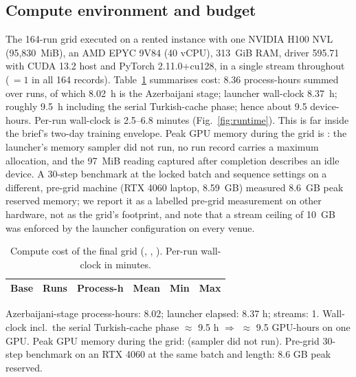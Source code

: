 \subsection{Compute environment and budget}
\label{sec:setup:compute}
The 164-run grid executed on a rented instance with one NVIDIA H100 NVL (95{,}830~MiB), an AMD EPYC 9V84 (40 vCPU), 313~GiB RAM, driver 595.71 with CUDA 13.2 host and PyTorch 2.11.0+cu128, in a single stream throughout (\,$=1$ in all 164 records). Table~\ref{tab:compute} summarises cost: 8.36 process-hours summed over runs, of which 8.02~h is the Azerbaijani stage; launcher wall-clock 8.37~h; roughly 9.5~h including the serial Turkish-cache phase; hence about 9.5 device-hours. Per-run wall-clock is 2.5–6.8 minutes (Fig.~\ref{fig:runtime}). This is far inside the brief's two-day training envelope. Peak GPU memory during the grid is \NM: the launcher's memory sampler did not run, no run record carries a maximum allocation, and the 97~MiB reading captured after completion describes an idle device. A 30-step benchmark at the locked batch and sequence settings on a different, pre-grid machine (RTX 4060 laptop, 8.59~GB) measured 8.6~GB peak reserved memory; we report it as a labelled pre-grid measurement on other hardware, not as the grid's footprint, and note that a stream ceiling of 10~GB was enforced by the launcher configuration on every venue.

\begin{table}[!t]
\caption{Compute cost of the final grid (, , ). Per-run wall-clock in minutes.}
\label{tab:compute}
\centering
\scriptsize
\begin{tabular}{@{}lrrrrr@{}}
\toprule
Base & Runs & Process-h & Mean & Min & Max \\
\midrule

\end{tabular}
\par\smallskip
\begin{minipage}{\columnwidth}\footnotesize
Azerbaijani-stage process-hours: 8.02; launcher elapsed: 8.37 h; streams: 1. Wall-clock incl.\ the serial Turkish-cache phase $\approx$ 9.5 h $\Rightarrow$ $\approx$ 9.5 GPU-hours on one GPU. Peak GPU memory during the grid: \NM{} (sampler did not run). Pre-grid 30-step benchmark on an RTX 4060 at the same batch and length: 8.6 GB peak reserved.
\end{minipage}
\end{table}

